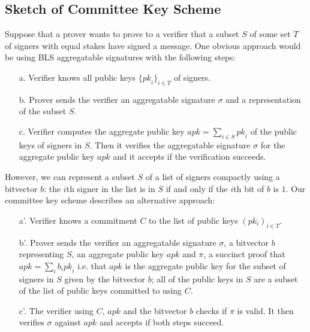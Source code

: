 \vspace{-0.3cm}
\subsection{Sketch of Committee Key Scheme}
\label{sec:lcsketch}
\vspace{-0.1cm}

\noindent Suppose that a prover wants to prove to a verifier that a subset $S$ of some set $T$ of signers {\color{red} with equal stakes} have signed a message. 
One obvious approach would be using BLS aggregatable signatures with the following steps:

\begin{itemize}
\item[a.] Verifier knows all public keys $\{\mathit{pk}_i\}_{i \in T}$ of signers.%

\item[b.] Prover sends the verifier an aggregatable signature $\sigma$ and a representation of the subset $S$.

\item[c.] Verifier computes the aggregate public key $\mathit{apk}=\sum_{i \in S} \mathit{pk}_i$ of the public keys of signers in $S$. 
Then it verifies the aggregatable signature $\sigma$ for the aggregate public key $\mathit{apk}$ and it accepts if the verification succeeds.
\end{itemize}

\noindent However, we can represent a subset $S$ of a list of signers compactly using a bitvector $b$: 
the $i$th signer in the list is in $S$ if and only if the $i$th bit of $b$ is $1$. Our committee key scheme describes an alternative approach:

\begin{itemize}
\item[a'.]\label{a'} Verifier knows a commitment $C$ to the list of public keys $(pk_i)_{i \in T}$.

\item[b'.]\label{b'} Prover sends the verifier an aggregatable signature $\sigma$, a bitvector $b$ representing $S$, an aggregate public key 
$\mathit{apk}$ and $\pi$, a succinct proof that $\mathit{apk}=\sum_i b_i \mathit{pk}_i$ i.e. 
that $\mathit{apk}$ is the aggregate public key for the subset of signers in $S$ given by the bitvector $b$; all of the public keys in $S$ are a subset 
of the list of public keys committed to using $C$.

\item[c'.] The verifier using $C$, $\mathit{apk}$ and the bitvector $b$ checks if $\pi$ is valid. 
It then verifies $\sigma$ against $\mathit{apk}$ and accepts if both steps succeed.
\end{itemize}


